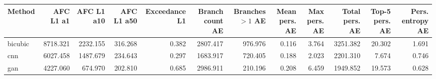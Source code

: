 \begin{tabular}{lrrrrrrrrrrr}
\toprule
Method & AFC L1 a1 & AFC L1 a10 & AFC L1 a50 & Exceedance L1 & Branch count AE & Branches $>1$ AE & Mean pers. AE & Max pers. AE & Total pers. AE & Top-5 pers. AE & Pers. entropy AE \\
\midrule
bicubic & 8718.321 & 2232.155 & 316.268 & 0.382 & 2807.417 & 976.976 & 0.116 & 3.764 & 3251.382 & 20.302 & 1.691 \\
cnn & 6027.458 & 1487.679 & 234.643 & 0.297 & 1683.917 & 720.405 & 0.188 & 2.023 & 2201.310 & 7.674 & 0.746 \\
gan & 4227.060 & 674.970 & 202.810 & 0.685 & 2986.911 & 210.196 & 0.208 & 6.459 & 1949.852 & 19.573 & 0.628 \\
\bottomrule
\end{tabular}
